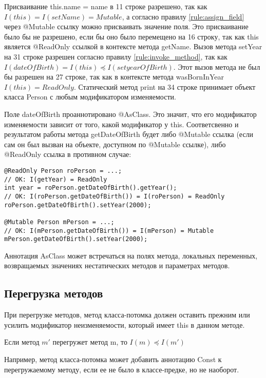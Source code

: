 Присваивание this.name = name в 11 строке разрешено, так как $I(this) = I(setName) = Mutable$, а согласно правилу \ref{rule:assign_field} через @Mutable ссылку можно присваивать значение поля. Это присваивание было бы не разрешено, если бы оно было перемещено  на 16 строку, так как this является @ReadOnly ссылкой в контексте метода getName. Вызов метода setYear на 31 строке разрешен согласно правилу \ref{rule:invoke_method}, так как $I(dateOfBirth) = I(this) \preceq I(setyearOfBirth)$. Этот вызов метода не был бы разрешен на 27 строке, так как в контексте метода wasBornInYear $I(this) = ReadOnly$. Статический метод print на 34 строке принимает объект класса Person с любым модификатором изменяемости. 

Поле dateOfBirth проаннотировано @AsClass. Это значит, что его модификатор изменяемости зависит от того, какой модификатор у this. Соответсвенно и результатом работы метода getDateOfBirth будет либо @Mutable ссылка (если сам он был вызван на объекте, доступном по @Mutable ссылке), либо @ReadOnly ссылка в противном случае:

\begin{lstlisting}[caption=Использование аннотации AsClass, label=code:as_class]
@ReadOnly Person roPerson = ...;
// OK: I(getYear) = ReadOnly
int year = roPerson.getDateOfBirth().getYear(); 
// OK: I(roPerson.getDateOfBirth()) = I(roPerson) = ReadOnly
roPerson.getDateOfBirth().setYear(2000); 
	
@Mutable Person mPerson = ...;
// OK: I(mPerson.getDateOfBirth()) = I(mPerson) = Mutable
mPerson.getDateOfBirth().setYear(2000); 
\end{lstlisting} 

Аннотация AsClass может встречаться на полях метода, локальных переменных, возвращаемых значениях нестатических методов и параметрах методов.

\subsection{Перегрузка методов}

При перегрузке методов, метод класса-потомка должен оставить прежним или усилить модификатор неизменяемости, который имеет this в данном методе. 

\begin{Rule}\label{rule:override_method}
Если метод $m'$ перегружет метод m, то $I(m) \preceq I(m')$
\end{Rule}

Например, метод класса-потомка может добавить аннотацию Const к перегружаемому методу, если ее не было в классе-предке, но не наоборот. 

